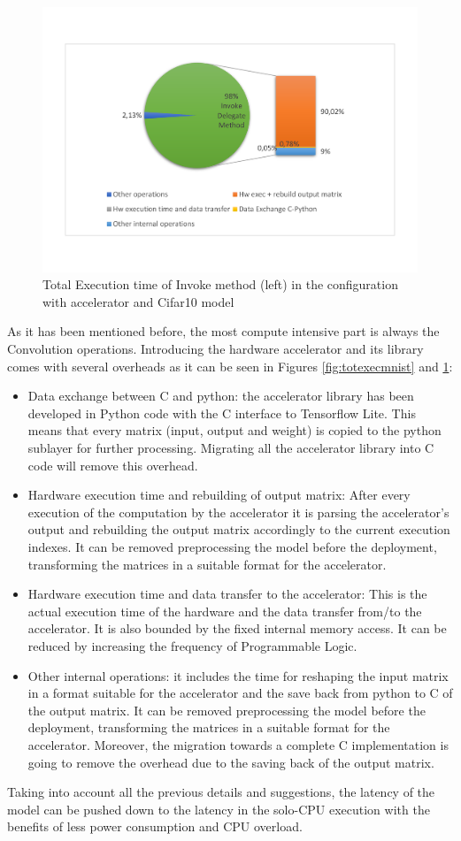\begin{figure}[!htbp]
\centering
\captionsetup{justification=centering}
\includegraphics[scale=0.55,angle=0]{./figure/graphs/latency_subdivision_cifar10.pdf}
\caption{Total Execution time of Invoke method (left) in the configuration with accelerator and Cifar10 model}
\label{fig:totexeccifar10}
\end{figure}
\newpage
As it has been mentioned before, the most compute intensive part is always the Convolution operations. Introducing the hardware accelerator and its library comes with several overheads as it can be seen in Figures \ref{fig:totexecmnist} and \ref{fig:totexeccifar10}:\\
\begin{itemize}
\item Data exchange between C and python: the accelerator library has been developed in Python code with the C interface to Tensorflow Lite. This means that every matrix (input, output and weight) is copied to the python sublayer for further processing. Migrating all the accelerator library into C code will remove this overhead.
\item Hardware execution time and rebuilding of output matrix: After every execution of the computation by the accelerator it is parsing the accelerator's output and rebuilding the output matrix accordingly to the current execution indexes. It can be removed preprocessing the model before the deployment, transforming the matrices in a suitable format for the accelerator.
\item Hardware execution time and data transfer to the accelerator: This is the actual execution time of the hardware and the data transfer from/to the accelerator. It is also bounded by the fixed internal memory access. It can be reduced by increasing the frequency of Programmable Logic.
\item Other internal operations: it includes the time for reshaping the input matrix in a format suitable for the accelerator and the save back from python to C of the output matrix. It can be removed preprocessing the model before the deployment, transforming the matrices in a suitable format for the accelerator. Moreover, the migration towards a complete C implementation is going to remove the overhead due to the saving back of the output matrix.\\
\end{itemize}
Taking into account all the previous details and suggestions, the latency of the model can be pushed down to the latency in the solo-CPU execution with the benefits of less power consumption and CPU overload.